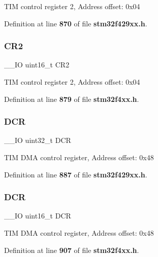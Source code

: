 T\+IM control register 2, Address offset\+: 0x04 

Definition at line \textbf{ 870} of file \textbf{ stm32f429xx.\+h}.

\mbox{\label{structTIM__TypeDef_a2a3e81bd118d1bc52d24a0b0772e6a0c}} 
\subsubsection{C\+R2\hspace{0.1cm}{\footnotesize\ttfamily [2/2]}}
{\footnotesize\ttfamily \+\_\+\+\_\+\+IO uint16\+\_\+t C\+R2}

T\+IM control register 2, Address offset\+: 0x04 

Definition at line \textbf{ 879} of file \textbf{ stm32f4xx.\+h}.

\mbox{\label{structTIM__TypeDef_af6225cb8f4938f98204d11afaffd41c9}} 
\subsubsection{D\+CR\hspace{0.1cm}{\footnotesize\ttfamily [1/2]}}
{\footnotesize\ttfamily \+\_\+\+\_\+\+IO uint32\+\_\+t D\+CR}

T\+IM D\+MA control register, Address offset\+: 0x48 

Definition at line \textbf{ 887} of file \textbf{ stm32f429xx.\+h}.

\mbox{\label{structTIM__TypeDef_a0afd527a4ec64faf878f9957096102bf}} 
\subsubsection{D\+CR\hspace{0.1cm}{\footnotesize\ttfamily [2/2]}}
{\footnotesize\ttfamily \+\_\+\+\_\+\+IO uint16\+\_\+t D\+CR}

T\+IM D\+MA control register, Address offset\+: 0x48 

Definition at line \textbf{ 907} of file \textbf{ stm32f4xx.\+h}.

\mbox{\label{structTIM__TypeDef_a07fccbd85b91e6dca03ce333c1457fcb}} 
